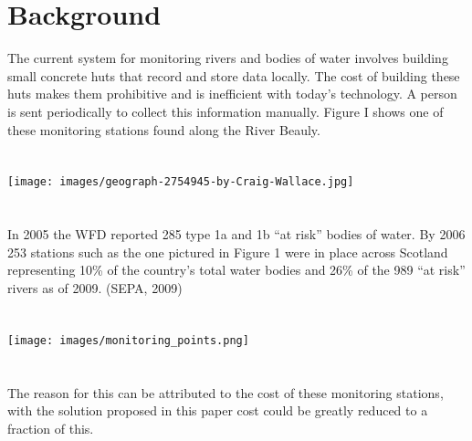\section{Background}
The current system for monitoring rivers and bodies of water involves building small concrete huts that record and store data locally. The cost of building these huts makes them prohibitive and is inefficient with today's technology. A person is sent periodically to collect this information manually. Figure I shows one of these monitoring stations found along the River Beauly. 
\\\\\\
\texttt{[image: images/geograph-2754945-by-Craig-Wallace.jpg]}
\\\\\\
In 2005 the WFD reported 285 type 1a and 1b “at risk” bodies of water. \citep{SEPA2007} By 2006  253 stations such as the one pictured in Figure 1 were in place across Scotland representing 10\% of the country’s total water bodies and 26\% of the 989  “at risk” rivers as of 2009. (SEPA, 2009)⁠
\\\\\\
\texttt{[image: images/monitoring\_points.png]}
\\\\\\
The reason for this can be attributed to the cost of these monitoring stations, with the solution proposed in this paper cost could be greatly reduced to a fraction of this. 